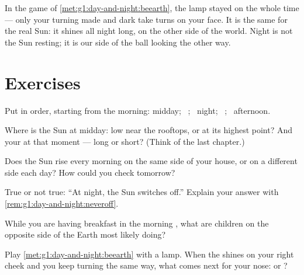 \begin{remark}\label{rem:g1:day-and-night:neveroff}
In the game of \cref{met:g1:day-and-night:beearth}, the lamp stayed
on the whole time --- only your turning made  and dark take
turns on your face. It is the same for the real Sun: it shines all
night long, on the other side of the world. Night is not the Sun
resting; it is our side of the ball looking the other way.
\end{remark}

\section{Exercises}

\begin{exercise}[$\star$]\label{exo:g1:day-and-night:1}
Put in order, starting from the morning: midday; \ ; \ night;
\ ; \ afternoon.
\end{exercise}

\begin{exercise}[$\star$]\label{exo:g1:day-and-night:2}
Where is the Sun at midday: low near the rooftops, or at its highest
point? And your  at that moment --- long or short? (Think of
the last chapter.)
\end{exercise}

\begin{exercise}[$\star$]\label{exo:g1:day-and-night:3}
Does the Sun rise every morning on the same side of your house, or on
a different side each day? How could you check tomorrow?
\end{exercise}

\begin{exercise}[$\star$]\label{exo:g1:day-and-night:4}
True or not true: ``At night, the Sun switches off.'' Explain your
answer with \cref{rem:g1:day-and-night:neveroff}.
\end{exercise}

\begin{exercise}[$\star$]\label{exo:g1:day-and-night:5}
While you are having breakfast in the morning , what are
children on the opposite side of the Earth most likely doing?
\end{exercise}

\begin{exercise}[$\star$]\label{exo:g1:day-and-night:6}
Play \cref{met:g1:day-and-night:beearth} with a lamp. When the 
shines on your right cheek and you keep turning the same way, what
comes next for your nose:  or ?
\end{exercise}

